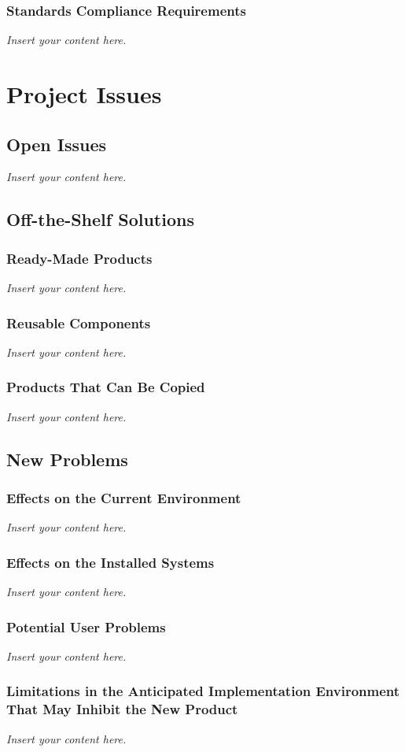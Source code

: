 \documentclass[12pt]{article}
\newcommand{\lips}{\textit{Insert your content here.}}
\begin{document}
\subsubsection{Standards Compliance Requirements}
\lips

\section{Project Issues}
\subsection{Open Issues}
\lips

\subsection{Off-the-Shelf Solutions}
\subsubsection{Ready-Made Products}
\lips
\subsubsection{Reusable Components}
\lips
\subsubsection{Products That Can Be Copied}
\lips

\subsection{New Problems}
\subsubsection{Effects on the Current Environment}
\lips
\subsubsection{Effects on the Installed Systems}
\lips
\subsubsection{Potential User Problems}
\lips
\subsubsection{Limitations in the Anticipated Implementation Environment That May
Inhibit the New Product}
\lips
\end{document}
